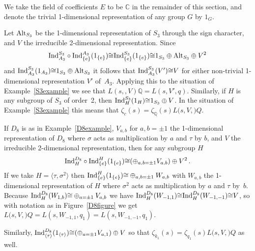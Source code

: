 \documentclass{amsart}
\begin{document}
We take the field of coefficients $ E $ to be $ {\mathbb C} $ in the remainder of this section, and 
denote the trivial 1-dimensional representation of any group $ G $ by $ 1_G $.

\begin{example}\label{S3L}
Let  $ {\textup{Alt}}_{S_3} $ be the 1-dimensional representation of $ S_3 $ through the sign character, and $ V $ 
the irreducible 2-dimensional representation.  
Since 
\[
 {\textup{Ind}_{A_3}^{S_3}}\circ {\textup{Ind}_{\{e\}}^{A_3}}(1_{\{e\}})  {\cong} {\textup{Ind}_{\{e\}}^{S_3}}(1_{\{e\}}) {\cong} 1_{S_3} \oplus {\textup{Alt}}_{S_3} \oplus V^2   
\]
and $ {\textup{Ind}_{A_3}^{S_3}}(1_{A_3}) {\cong} 1_{S_3} \oplus {\textup{Alt}}_{S_3} $ it follows that
$ {\textup{Ind}_{A_3}^{S_3}}(V') {\cong} V $ for either non-trivial 1-dimensional representation $ V' $ of~$ A_3 $.
Applying this to the situation of Example~\ref{S3example} we see that
$ {L(s,,V)}{\mathbb Q} = {L(s,V',q)}$.
Similarly, if $ H $ is any subgroup of $ S_3 $ of order~2, then 
$ {\textup{Ind}_{H}^{S_3}}(1_H) {\cong} 1_{S_3} \oplus V $.
In the situation of Example~\ref{S3example} this means that $ {\zeta}_{c}(s) = {\zeta}_{\mathbb Q}(s) {L(s,V,{\mathbb)}Q} $.
\end{example}

\begin{example}\label{D8L}
If $ D_8 $ is as in Example~\ref{D8example}, $ {V_{a,b}}$ for $ a,b=\pm1 $
the 1-dimensional representation of $ D_8 $ where $ {\sigma} $ acts as multiplication by
$ a $ and $ {\tau} $ by $ b $, and $ V $ the irreducible 2-dimensional representation, then for any subgroup $ H $
$$
{\textup{Ind}_{H}^{D_8}}\circ {\textup{Ind}_{{\{e\}}}^{H}}(1_{\{e\}}) {\cong} (\oplus_{a,b=\pm1} {V_{a,b}}) \oplus V^2
\,.
$$
If we take $ H = \langle {\tau}, {\sigma}^2 \rangle $ then
$ {\textup{Ind}_{{\{e\}}}^{H}}(1_{\{e\}}) {\cong} \oplus_{a,b=\pm1} {W_{a,b}}$
with $ {W_{a,b}}$ the 1-dimensional representation of $ H $ where $ {\sigma}^2 $ acts as multiplication by 
$ a $ and $ {\tau} $ by~$ b $.
Because $ {\textup{Ind}_{H}^{D_8}}({W_{1,b}}) {\cong} \oplus_{a=\pm1} {V_{a,b}}$ we have $ {\textup{Ind}_{H}^{D_8}}({W_{-1,1}}) {\cong} {\textup{Ind}_{H}^{D_8}}({W_{-1,-1}}) {\cong} V $,
so with notation as in Figure~\ref{D8figure} we get $ {L(s,V,{\mathbb)}Q}  = {L(s,{{W_{-1,1}}},q_1)}= {L(s,{{W_{-1,-1}}},q_1)}$.

Similarly, $ {\textup{Ind}_{{\langle{\tau}\rangle}}^{D_8}}(1_{\langle{\tau}\rangle}) {\cong} ( \oplus_{a=\pm1} V_{a,1} ) \oplus V $
so that $ {\zeta}_{k_1}(s) = {\zeta}_{q_1}(s) {L(s,V,{\mathbb)}Q} $ as well.
\end{example}
\end{document}

